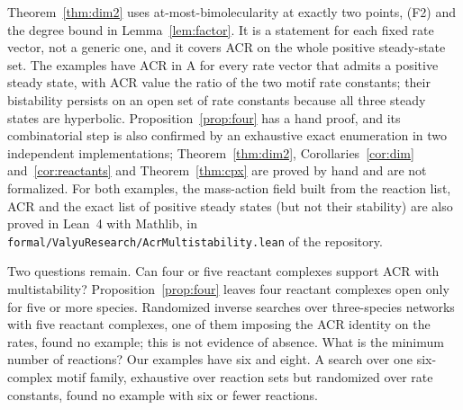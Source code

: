 \documentclass[11pt]{amsart}
\theoremstyle{definition}
\theoremstyle{remark}
\newcommand{\ce}[1]{\mathrm{#1}}
\begin{document}
Theorem~\ref{thm:dim2} uses at-most-bimolecularity at exactly two points, (F2) and the degree bound in Lemma~\ref{lem:factor}. It is a statement for each fixed rate vector, not a generic one, and it covers ACR on the whole positive steady-state set. The examples have ACR in $\ce A$ for every rate vector that admits a positive steady state, with ACR value the ratio of the two motif rate constants; their bistability persists on an open set of rate constants because all three steady states are hyperbolic. Proposition~\ref{prop:four} has a hand proof, and its combinatorial step is also confirmed by an exhaustive exact enumeration in two independent implementations; Theorem~\ref{thm:dim2}, Corollaries~\ref{cor:dim} and~\ref{cor:reactants} and Theorem~\ref{thm:cpx} are proved by hand and are not formalized. For both examples, the mass-action field built from the reaction list, ACR and the exact list of positive steady states (but not their stability) are also proved in Lean~4 with Mathlib, in \texttt{formal/ValyuResearch/AcrMultistability.lean} of the repository.

Two questions remain. Can four or five reactant complexes support ACR with multistability? Proposition~\ref{prop:four} leaves four reactant complexes open only for five or more species. Randomized inverse searches over three-species networks with five reactant complexes, one of them imposing the ACR identity on the rates, found no example; this is not evidence of absence. What is the minimum number of reactions? Our examples have six and eight. A search over one six-complex motif family, exhaustive over reaction sets but randomized over rate constants, found no example with six or fewer reactions.



\end{document}
